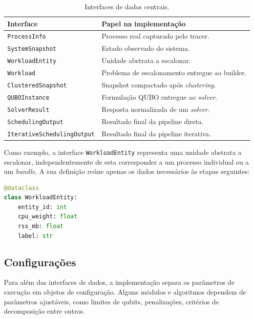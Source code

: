 \begin{table}[H]
\centering
\small
\begin{tabular}{p{}p{}}
\hline
\textbf{Interface} & \textbf{Papel na implementação} \\
\hline
\texttt{ProcessInfo} & Processo real capturado pelo tracer. \\
\texttt{SystemSnapshot} & Estado observado do sistema. \\
\texttt{WorkloadEntity} & Unidade abstrata a escalonar. \\
\texttt{Workload} & Problema de escalonamento entregue ao builder. \\
\texttt{ClusteredSnapshot} & Snapshot compactado após \textit{clustering}. \\
\texttt{QUBOInstance} & Formulação \acs{QUBO} entregue ao \textit{solver}. \\
\texttt{SolverResult} & Resposta normalizada de um \textit{solver}. \\
\texttt{SchedulingOutput} & Resultado final da pipeline direta. \\
\texttt{IterativeSchedulingOutput} & Resultado final da pipeline iterativa. \\
\hline
\end{tabular}
\caption{Interfaces de dados centrais.}
\label{tab:interfaces-dados}
\end{table}

Como exemplo, a interface \texttt{WorkloadEntity} representa uma unidade abstrata a
escalonar, independentemente de esta corresponder a um processo individual ou a um
\textit{bundle}. A sua definição reúne apenas os dados necessários às etapas seguintes:

\begin{lstlisting}[language=Python,caption={Exemplo da interface de dados \texttt{WorkloadEntity}.}]
@dataclass
class WorkloadEntity:
    entity_id: int
    cpu_weight: float
    rss_mb: float
    label: str
\end{lstlisting}

\subsection{Configurações}
\label{subsec:configuracoes}

Para além das interfaces de dados, a implementação separa os parâmetros de
execução em objetos de configuração. Alguns módulos e algoritmos dependem de
parâmetros ajustáveis, como limites de qubits, penalizações, critérios de decomposição entre outros. 

